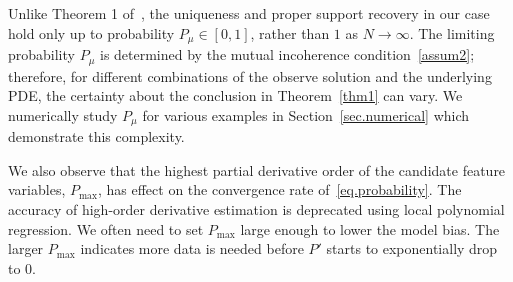 \documentclass[a4paper,11pt]{article}
\theoremstyle{definition}
\begin{document}
Unlike Theorem 1 of~\cite{wainwright2009sharp}, the uniqueness and proper support recovery in our case hold only up to probability $P_\mu\in [0,1]$, rather than $1$ as $N\to\infty$. The limiting probability $P_\mu$ is determined by the mutual incoherence condition~\eqref{assum2}; therefore, for different combinations of the observe solution and the underlying PDE, the certainty about the conclusion in Theorem~\ref{thm1} can vary. We numerically study $P_\mu$ for various examples in Section~\ref{sec.numerical} which demonstrate this complexity.

We also observe that the highest partial derivative order of the candidate feature variables, $P_{\max}$, has effect on the convergence rate of~\eqref{eq.probability}. The accuracy of high-order derivative estimation is deprecated using local polynomial regression. We  often need to set $P_{\max}$ large enough to lower the model bias.  The larger $P_{\max}$ indicates more data is needed before $P'$ starts to exponentially drop to $0$.
\end{document}
